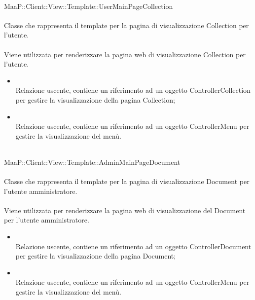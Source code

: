 	\\
	MaaP::Client::View::Template::UserMainPageCollection\\
	\\
	Classe che rappresenta il template per la pagina di visualizzazione Collection per l'utente.\\
	\\
	Viene utilizzata per renderizzare la pagina web di visualizzazione Collection per l'utente.\\
	\begin{itemize}
	\item{}\\
	Relazione uscente, contiene un riferimento ad un oggetto ControllerCollection per gestire la visualizzazione della pagina Collection;
	\item{}\\
	Relazione uscente, contiene un riferimento ad un oggetto ControllerMenu per gestire la visualizzazione del menù.
	\end{itemize}
	
	\\
	MaaP::Client::View::Template::AdminMainPageDocument\\
	\\
	Classe che rappresenta il template per la pagina di visualizzazione Document per l'utente amministratore.\\
	\\
	Viene utilizzata per renderizzare la pagina web di visualizzazione del Document per l'utente amministratore.\\
	\begin{itemize}
	\item{}\\
	Relazione uscente, contiene un riferimento ad un oggetto ControllerDocument per gestire la visualizzazione della pagina Document;
	\item{}\\
	Relazione uscente, contiene un riferimento ad un oggetto ControllerMenu per gestire la visualizzazione del menù.
	\end{itemize}
	
